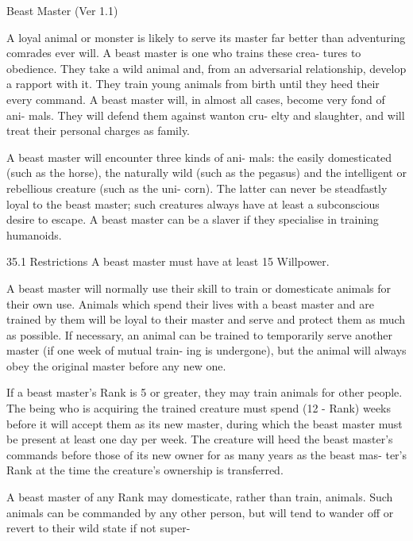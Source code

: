 \begin{Chapter}{Beast Master (Ver 1.1)}

A  loyal  animal  or  monster  is  likely  to  serve  its 
master  far  better  than  adventuring  comrades  ever 
will.  A  beast  master  is  one  who  trains  these  crea-
tures  to  obedience.  They  take  a  wild  animal  and, 
from an adversarial relationship, develop a rapport 
with  it.  They  train  young  animals  from  birth  until 
they  heed  their  every  command.  A  beast  master 
will, in almost all cases, become very fond of ani-
mals.  They  will  defend  them  against  wanton  cru-
elty  and  slaughter,  and  will  treat  their  personal 
charges as family. 

A  beast  master  will  encounter  three  kinds  of  ani-
mals:  the  easily  domesticated  (such  as  the  horse), 
the  naturally  wild  (such  as  the  pegasus)  and  the 
intelligent  or  rebellious  creature  (such  as  the  uni-
corn).  The  latter  can  never  be  steadfastly  loyal  to 
the  beast  master;  such  creatures  always  have  at 
least  a  subconscious  desire  to  escape.  A  beast 
master can be a slaver if they specialise in training 
humanoids. 

35.1 Restrictions 
A beast master must have at least 15 Willpower. 

A beast master will normally use their skill to train 
or domesticate animals for their own use. Animals 
which spend their lives with a beast master and are 
trained  by  them  will  be  loyal  to  their  master  and 
serve  and  protect  them  as  much  as  possible.  If 
necessary, an animal can be trained to temporarily 
serve another master (if one week of mutual train-
ing is undergone), but the animal will always obey 
the original master before any new one. 

If  a  beast  master’s  Rank  is  5  or  greater,  they  may 
train  animals  for  other  people.  The  being  who  is 
acquiring  the  trained  creature  must  spend  (12  - 
Rank)  weeks  before  it  will  accept  them as  its new 
master,  during  which  the  beast  master  must  be 
present at least one day per week. The creature will 
heed the beast master’s commands before those of 
its new owner for as many years as the beast mas-
ter’s  Rank  at  the  time  the  creature’s  ownership  is 
transferred. 

A  beast  master  of  any  Rank  may  domesticate, 
rather  than  train,  animals.  Such  animals  can  be 
commanded  by  any  other  person,  but  will  tend  to 
wander off or revert to their wild state if not super-


\end{Chapter}

